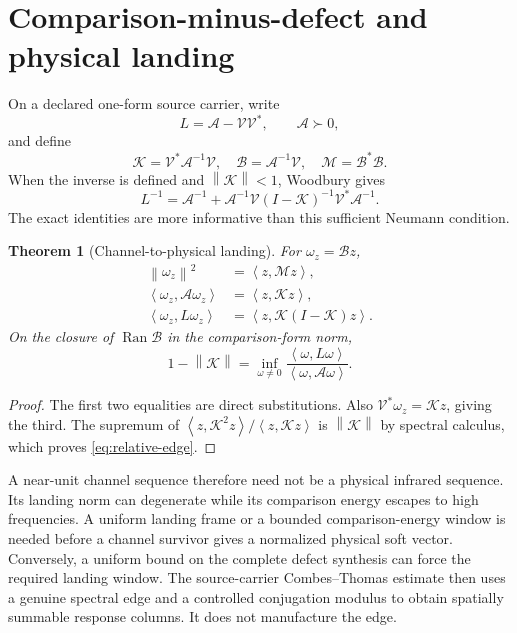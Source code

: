 \documentclass[11pt,oneside,openany]{book}
\newtheorem{theorem}{Theorem}[chapter]
\theoremstyle{definition}
\theoremstyle{remark}
\newcommand{\Ran}{\operatorname{Ran}}
\newcommand{\norm}[1]{\left\lVert#1\right\rVert}
\newcommand{\ip}[2]{\left\langle#1,#2\right\rangle}
\newcommand{\src}[2]{\cite[#2]{#1}}
\begin{document}
\section{Comparison-minus-defect and physical landing}
On a declared one-form source carrier, write
\[
L=\mathcal A-\mathcal V\mathcal V^*,\qquad \mathcal A\succ0,
\]
and define
\begin{equation}\label{eq:woodbury-objects}
\mathcal K=\mathcal V^*\mathcal A^{-1}\mathcal V,
\quad \mathcal B=\mathcal A^{-1}\mathcal V,
\quad \mathcal M=\mathcal B^*\mathcal B.
\end{equation}
When the inverse is defined and $\norm{\mathcal K}<1$, Woodbury gives
\[
L^{-1}=\mathcal A^{-1}
+\mathcal A^{-1}\mathcal V(I-\mathcal K)^{-1}\mathcal V^*\mathcal A^{-1}.
\]
The exact identities are more informative than this sufficient Neumann condition.

\begin{theorem}[Channel-to-physical landing]\label{thm:landing}
For $\omega_z=\mathcal Bz$,
\begin{equation}\label{eq:landing}
\begin{aligned}
\norm{\omega_z}^2&=\ip{z}{\mathcal Mz},\\
\ip{\omega_z}{\mathcal A\omega_z}&=\ip{z}{\mathcal Kz},\\
\ip{\omega_z}{L\omega_z}&=\ip{z}{\mathcal K(I-\mathcal K)z}.
\end{aligned}
\end{equation}
On the closure of $\Ran\mathcal B$ in the comparison-form norm,
\begin{equation}\label{eq:relative-edge}
1-\norm{\mathcal K}
=\inf_{\omega\ne0}
\frac{\ip{\omega}{L\omega}}{\ip{\omega}{\mathcal A\omega}}.
\end{equation}
\end{theorem}
\begin{proof}
The first two equalities are direct substitutions. Also $\mathcal V^*\omega_z=\mathcal Kz$, giving the third. The supremum of $\ip{z}{\mathcal K^2z}/\ip{z}{\mathcal Kz}$ is $\norm{\mathcal K}$ by spectral calculus, which proves \cref{eq:relative-edge}.
\end{proof}

A near-unit channel sequence therefore need not be a physical infrared sequence. Its landing norm can degenerate while its comparison energy escapes to high frequencies. A uniform landing frame or a bounded comparison-energy window is needed before a channel survivor gives a normalized physical soft vector. Conversely, a uniform bound on the complete defect synthesis can force the required landing window. The source-carrier Combes--Thomas estimate then uses a genuine spectral edge and a controlled conjugation modulus to obtain spatially summable response columns. It does not manufacture the edge. \src{F1}{V16--V20}
\end{document}

